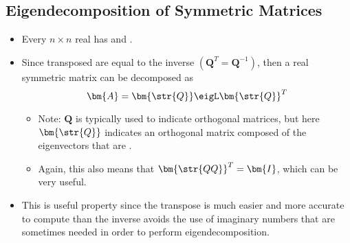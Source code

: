 \begin{itemize}
  \subsection{Eigendecomposition of Symmetric Matrices}\label{Eigendecomposition of Symmetric Matrices}
  \begin{itemize}
    \item Every \(n \times n \) real \hyperref[Symmetric and Skew-Symmetric Matrices]{} has  and .
    \item Since \hyperref[Orthogonalization]{} transposed are equal to the inverse \((\bm{Q}^T = \bm{Q}^{-1})\), then a real symmetric matrix  can be decomposed as
    \[%
    \bm{A} = \bm{\str{Q}}\eigL \bm{\str{Q}}^T
    \]%
    \begin{itemize}
      \item Note: \(\bm{Q}\) is typically used to indicate orthogonal matrices, but here \(\bm{\str{Q}}\) indicates an orthogonal matrix composed of the eigenvectors that are \hyperref[Vector Length]{}.
      \item Again, this also means that \(\bm{\str{QQ}}^T = \bm{I}\), which can be very useful.
    \end{itemize}
    \item This is useful property since the transpose is much easier and more accurate to compute than the inverse avoids the use of imaginary numbers that are sometimes needed in order to perform eigendecomposition.
  \end{itemize}
  

\end{itemize}
